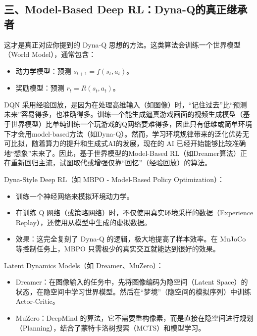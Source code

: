 \hypertarget{ux4e09model-based-deep-rldyna-qux7684ux771fux6b63ux7ee7ux627fux8005}{%
\subsection{三、Model-Based Deep RL：Dyna-Q的真正继承者}\label{ux4e09model-based-deep-rldyna-qux7684ux771fux6b63ux7ee7ux627fux8005}}

这才是真正对应你提到的 Dyna-Q 思想的方法。这类算法会训练一个世界模型（World Model），通常包含：

\begin{itemize}
\tightlist
\item
  动力学模型：预测 \(s_{t+1}=f(s_t,a_t)\)。
\item
  奖励模型：预测 \(r_t=R(s_t,a_t)\)。
\end{itemize}

DQN 采用经验回放，是因为在处理高维输入（如图像）时，``记住过去''比``预测未来''容易得多，也准确得多。训练一个能生成逼真游戏画面的视频生成模型（基于世界模型）比单纯训练一个玩游戏的Q网络要难得多，因此只有低维或简单环境下才会用model-based方法（如Dyna-Q）。然而，学习环境规律带来的泛化优势无可比拟，随着算力的提升和生成式AI的发展，现在的 AI 已经开始能够比较准确地``想象''未来了。因此，基于世界模型的Model-Based RL（如Dreamer算法）正在重新回归主流，试图取代或增强仅靠``回忆''（经验回放）的算法。

Dyna-Style Deep RL（如 MBPO - Model-Based Policy Optimization）：

\begin{itemize}
\tightlist
\item
  训练一个神经网络来模拟环境动力学。
\item
  在训练 Q 网络（或策略网络）时，不仅使用真实环境采样的数据（Experience Replay），还使用从模型中生成的虚拟数据。
\item
  效果：这完全复刻了 Dyna-Q 的逻辑，极大地提高了样本效率。在 MuJoCo 等控制任务上，MBPO 只需极少的真实交互就能达到很好的效果。
\end{itemize}

Latent Dynamics Models（如 Dreamer、MuZero）：

\begin{itemize}
\tightlist
\item
  Dreamer：在图像输入的任务中，先将图像编码为隐空间（Latent Space）的状态，在隐空间中学习世界模型。然后在``梦境''（隐空间的模拟序列）中训练 Actor-Critic。
\item
  MuZero：DeepMind 的算法，它不需要重构像素，而是直接在隐空间进行规划（Planning），结合了蒙特卡洛树搜索（MCTS）和模型学习。
\end{itemize}


